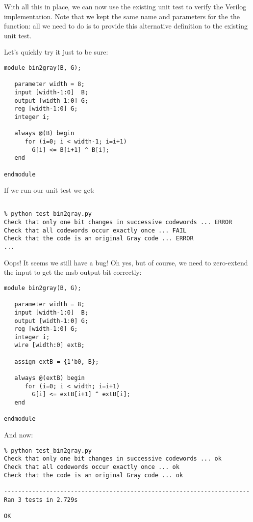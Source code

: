 With all this in place, we can now use the existing unit test
to verify the Verilog implementation. Note that we kept the
same name and parameters for the the  function:
all we need to do is to provide this alternative definition
to the existing unit test.

Let's quickly try it just to be sure:

\begin{verbatim}
module bin2gray(B, G);

   parameter width = 8;
   input [width-1:0]  B;
   output [width-1:0] G;
   reg [width-1:0] G;
   integer i;

   always @(B) begin
      for (i=0; i < width-1; i=i+1)
        G[i] <= B[i+1] ^ B[i];
   end

endmodule

\end{verbatim}

If we run our unit test we get:

\begin{verbatim}

% python test_bin2gray.py   
Check that only one bit changes in successive codewords ... ERROR
Check that all codewords occur exactly once ... FAIL
Check that the code is an original Gray code ... ERROR
...

\end{verbatim}

Oops! It seems we still have a bug! Oh yes, but of course, 
we need to zero-extend the input to get the msb output bit
correctly:

\begin{verbatim}
module bin2gray(B, G);

   parameter width = 8;
   input [width-1:0]  B;
   output [width-1:0] G;
   reg [width-1:0] G;
   integer i;
   wire [width:0] extB;

   assign extB = {1'b0, B};

   always @(extB) begin
      for (i=0; i < width; i=i+1)
        G[i] <= extB[i+1] ^ extB[i];
   end

endmodule

\end{verbatim}

And now:

\begin{verbatim}
% python test_bin2gray.py 
Check that only one bit changes in successive codewords ... ok
Check that all codewords occur exactly once ... ok
Check that the code is an original Gray code ... ok

----------------------------------------------------------------------
Ran 3 tests in 2.729s

OK

\end{verbatim}


